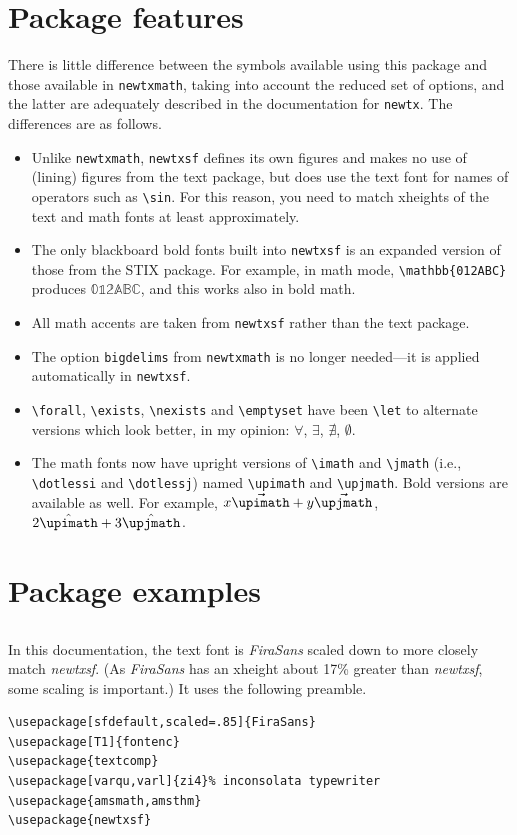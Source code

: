 \documentclass[11pt]{article}
\begin{document}
\section{Package features}
There is little difference between the symbols available using this package and those available in {\tt newtxmath}, taking into account the reduced set of options, and the latter are adequately described in the documentation for {\tt newtx}. The differences are as follows.
\begin{itemize}
\item
Unlike {\tt newtxmath}, {\tt newtxsf} defines its own figures and makes no use of (lining) figures from the text package, but does use the text font for names of operators such as \verb|\sin|. For this reason, you need to match xheights of the text and math fonts at least approximately.
\item The only blackboard bold fonts built into {\tt newtxsf} is an expanded version of those from the STIX package. For example, in math mode, \verb|\mathbb{012ABC}| produces $\mathbb{012ABC}$, and this works also in bold math.
\item All math accents are taken from {\tt newtxsf} rather than the text package.
\item The option {\tt bigdelims} from {\tt newtxmath} is no longer needed---it is applied automatically in {\tt newtxsf}.
\item \verb|\forall|, \verb|\exists|, \verb|\nexists| and \verb|\emptyset| have been \verb|\let| to alternate versions which look better, in my opinion: $\forall$, $\exists$, $\nexists$, $\emptyset$.
\item The math fonts now have upright versions of \verb|\imath| and \verb|\jmath| (i.e., \verb|\dotlessi| and \verb|\dotlessj|) named \verb|\upimath| and \verb|\upjmath|. Bold versions are available as well. For example, $x{\bm{\vec\upimath}}+y{\bm{\vec\upjmath}}$, $2\hat\upimath+3\hat\upjmath$.
\end{itemize}

\section{Package examples}
\subsection{}
In this documentation, the text font is \emph{FiraSans} scaled down to  more closely match \emph{newtxsf}. (As \emph{FiraSans} has an xheight about 17\% greater than \emph{newtxsf}, some scaling is important.)
It uses the following preamble.
\begin{verbatim}
\usepackage[sfdefault,scaled=.85]{FiraSans}
\usepackage[T1]{fontenc} 
\usepackage{textcomp}
\usepackage[varqu,varl]{zi4}% inconsolata typewriter
\usepackage{amsmath,amsthm}
\usepackage{newtxsf}
\end{verbatim}
\end{document}

